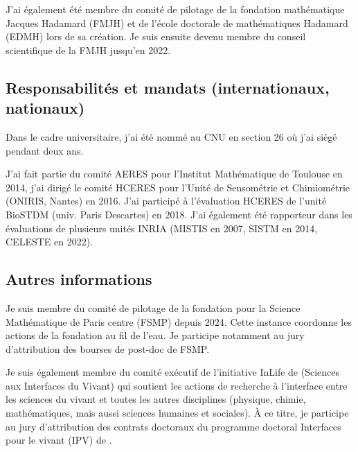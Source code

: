 J'ai également été membre du comité de pilotage de la fondation mathématique Jacques Hadamard (FMJH) et de l'école doctorale de mathématiques Hadamard (EDMH) lors de sa création. Je suis ensuite devenu membre du conseil scientifique de la FMJH jusqu’en 2022. 



\subsection{Responsabilités et mandats (internationaux, nationaux)}
Dans le cadre universitaire, j’ai été nommé au CNU en section 26 où j’ai siégé pendant deux ans. 

J’ai fait partie du comité AERES pour l’Institut Mathématique de Toulouse en 2014, j’ai dirigé le comité HCERES pour l’Unité de Sensométrie et Chimiométrie (ONIRIS, Nantes) en 2016. J’ai participé à l’évaluation HCERES de l’unité BioSTDM (univ. Paris Descartes) en 2018. J’ai également été rapporteur dans les évaluations de plusieurs unités INRIA (MISTIS en 2007, SISTM en 2014, CELESTE en 2022).

\subsection{Autres informations}
Je suis membre du comité de pilotage de la fondation pour la Science Mathématique de Paris centre (FSMP) depuis 2024. Cette instance coordonne les actions de la fondation au fil de l’eau. Je participe notamment au jury d’attribution des bourses de post-doc de FSMP.

Je suis également membre du comité exécutif de l'initiative InLife de \SU (Sciences aux Interfaces du Vivant) qui soutient les actions de recherche à l’interface entre les sciences du vivant et toutes les autres disciplines (physique, chimie, mathématiques, mais aussi sciences humaines et sociales). À ce titre, je participe au jury d’attribution des contrats doctoraux du programme doctoral Interfaces pour le vivant (IPV) de \SU.
